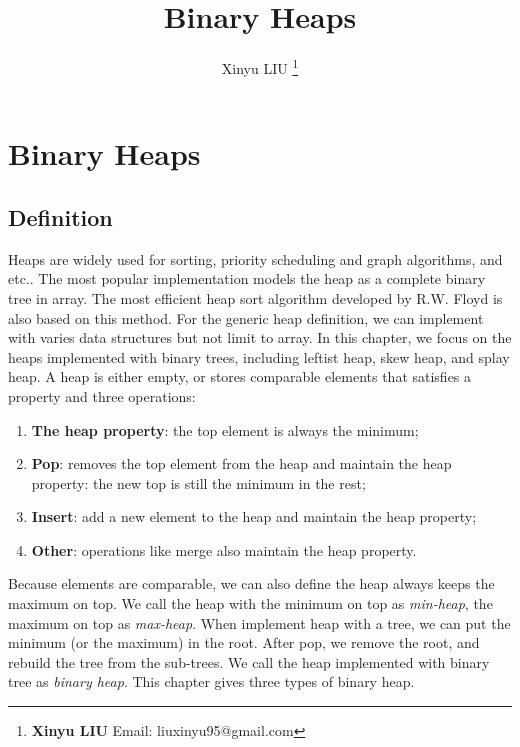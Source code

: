 \documentclass[b5paper]{article}
\begin{document}
\title{Binary Heaps}

\author{Xinyu LIU
\thanks{{\bfseries Xinyu LIU} \newline
  Email: liuxinyu95@gmail.com \newline}
  }

\maketitle
\fi


\ifx\wholebook\relax
\chapter{Binary Heaps}
\fi

\section{Definition}
\label{introduction} 

Heaps are widely used for sorting, priority scheduling and graph algorithms, and etc.\cite{wiki-heap}. The most popular implementation models the heap as a complete binary tree in array\cite{CLRS}. The most efficient heap sort algorithm developed by R.W. Floyd is also based on this method\cite{wiki-heapsort}\cite{rosetta-heapsort}. For the generic heap definition, we can implement with varies data structures but not limit to array. In this chapter, we focus on the heaps implemented with binary trees, including leftist heap, skew heap, and splay heap\cite{okasaki-book}. A heap is either empty, or stores comparable elements that satisfies a property and three operations:

\begin{enumerate}
\item \textbf{The heap property}: the top element is always the minimum;
\item \textbf{Pop}: removes the top element from the heap and maintain the heap property: the new top is still the minimum in the rest;
\item \textbf{Insert}: add a new element to the heap and maintain the heap property;
\item \textbf{Other}: operations like merge also maintain the heap property.
\end{enumerate}

Because elements are comparable, we can also define the heap always keeps the maximum on top. We call the heap with the minimum on top as {\em min-heap}, the maximum on top as {\em max-heap}. When implement heap with a tree, we can put the minimum (or the maximum) in the root. After pop, we remove the root, and rebuild the tree from the sub-trees. We call the heap implemented with binary tree as {\em binary heap}. This chapter gives three types of binary heap.
\end{document}

